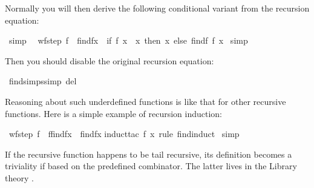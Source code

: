 \begin{isabellebody}
\begin{isamarkuptext}
Normally you will then derive the following conditional variant from
the recursion equation:%
\end{isamarkuptext}%
\isamarkuptrue%
\isamarkupfalse%
\ {\isacharbrackleft}simp{\isacharbrackright}{\isacharcolon}\isanewline
\ \ {\isachardoublequoteopen}wf{\isacharparenleft}step{}\ f{\isacharparenright}\ {\isasymLongrightarrow}\ find{\isacharparenleft}f{\isacharcomma}x{\isacharparenright}\ {\isacharequal}\ {\isacharparenleft}if\ f\ x\ {\isacharequal}\ x\ then\ x\ else\ find{\isacharparenleft}f{\isacharcomma}\ f\ x{\isacharparenright}{\isacharparenright}{\isachardoublequoteclose}\isanewline
%
\isadelimproof
%
\endisadelimproof
%
\isatagproof
{}\isamarkupfalse%
\ simp%
\endisatagproof
{\isafoldproof}%
%
\isadelimproof
%
\endisadelimproof
%
\begin{isamarkuptext}%
\noindent Then you should disable the original recursion equation:%
\end{isamarkuptext}%
\isamarkuptrue%
\isamarkupfalse%
\ find{\isachardot}simps{\isacharbrackleft}simp\ del{\isacharbrackright}%
\begin{isamarkuptext}%
Reasoning about such underdefined functions is like that for other
recursive functions.  Here is a simple example of recursion induction:%
\end{isamarkuptext}%
\isamarkuptrue%
\isamarkupfalse%
\ {\isachardoublequoteopen}wf{\isacharparenleft}step{}\ f{\isacharparenright}\ {\isasymlongrightarrow}\ f{\isacharparenleft}find{\isacharparenleft}f{\isacharcomma}x{\isacharparenright}{\isacharparenright}\ {\isacharequal}\ find{\isacharparenleft}f{\isacharcomma}x{\isacharparenright}{\isachardoublequoteclose}\isanewline
%
\isadelimproof
%
\endisadelimproof
%
\isatagproof
{}\isamarkupfalse%
{\isacharparenleft}induct{\isacharunderscore}tac\ f\ x\ rule{\isacharcolon}\ find{\isachardot}induct{\isacharparenright}\isanewline
{}\isamarkupfalse%
\ simp\isanewline
{}\isamarkupfalse%
%
\endisatagproof
{\isafoldproof}%
%
\isadelimproof
%
\endisadelimproof
%
\isamarkuptrue%
%
\begin{isamarkuptext}%
If the recursive function happens to be tail recursive, its
definition becomes a triviality if based on the predefined 
combinator.  The latter lives in the Library theory .


\end{isamarkuptext}
\end{isabellebody}
